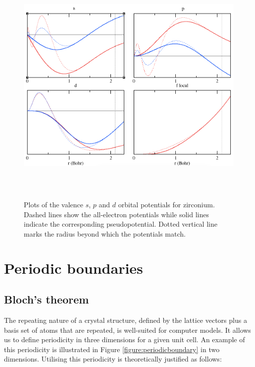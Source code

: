 \begin{figure} %
\begin{center}
\includegraphics[height=12cm]{images/zirconium_otf_pp.png}
\end{center}
\caption{Plots of the valence $s$, $p$ and $d$ orbital potentials for zirconium. Dashed lines show the all-electron potentials while solid lines indicate the corresponding pseudopotential. Dotted vertical line marks the radius beyond which the potentials match.}
\label{figure:zirconium_pseudopotential}
\end{figure}


\section{Periodic boundaries}

\subsection{Bloch's theorem}

The repeating nature of a crystal structure, defined by the lattice vectors plus a basis set of atoms that are repeated, is well-suited for computer models. It allows us to define periodicity in three dimensions for a given unit cell. An example of this periodicity is illustrated in Figure \ref{figure:periodicboundary} in two dimensions. Utilising this periodicity is theoretically justified as follows:

